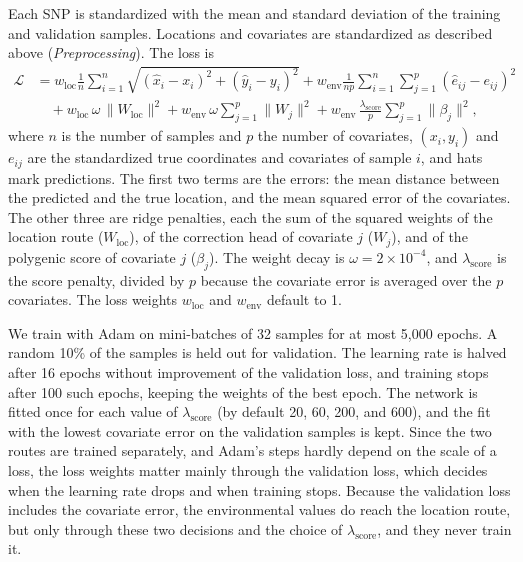 \documentclass[]{article}
\providecommand{\llabel}[1]{}%
\begin{document}
Each SNP is standardized with the mean and standard deviation
of the training and validation samples.
Locations and covariates are standardized as described above
(\textit{Preprocessing}).
The loss is
\begin{equation} \label{eq:1}
\begin{split}
\mathcal{L} &= w_{\text{loc}} \frac{1}{n} \sum_{i=1}^{n}
  \sqrt{(\hat{x}_i - x_i)^2 + (\hat{y}_i - y_i)^2}
  + w_{\text{env}} \frac{1}{np} \sum_{i=1}^{n} \sum_{j=1}^{p}
  (\hat{e}_{ij} - e_{ij})^2 \\
&\quad + w_{\text{loc}}\, \omega\, \|W_{\text{loc}}\|^2
  + w_{\text{env}}\, \omega \sum_{j=1}^{p} \|W_{j}\|^2
  + w_{\text{env}}\, \frac{\lambda_{\text{score}}}{p} \sum_{j=1}^{p} \|\beta_j\|^2,
\end{split}
\end{equation}
where $n$ is the number of samples and $p$ the number of covariates,
$(x_i, y_i)$ and $e_{ij}$ are the standardized true coordinates
and covariates of sample $i$, and hats mark predictions.
The first two terms are the errors:
the mean distance between the predicted and the true location,
and the mean squared error of the covariates.
The other three are ridge penalties,
each the sum of the squared weights
of the location route ($W_{\text{loc}}$),
of the correction head of covariate $j$ ($W_j$),
and of the polygenic score of covariate $j$ ($\beta_j$).
The weight decay is $\omega = 2 \times 10^{-4}$,
and $\lambda_{\text{score}}$ is the score penalty,
divided by $p$ because the covariate error is averaged over the $p$ covariates.
The loss weights $w_{\text{loc}}$ and $w_{\text{env}}$ default to 1.

We train with Adam on mini-batches of 32 samples
for at most 5,000 epochs.
A random 10\% of the samples is held out for validation.
The learning rate is halved after 16 epochs
without improvement of the validation loss,
and training stops after 100 such epochs,
keeping the weights of the best epoch.
The network is fitted once for each value of $\lambda_{\text{score}}$
(by default 20, 60, 200, and 600),
and the fit with the lowest covariate error on the validation samples is kept.
Since the two routes are trained separately,
and Adam's steps hardly depend on the scale of a loss,
the loss weights matter mainly through the validation loss,
which decides when the learning rate drops and when training stops.\llabel{lossweights}
Because the validation loss includes the covariate error,
the environmental values do reach the location route,
but only through these two decisions and the choice of $\lambda_{\text{score}}$,
and they never train it.
\end{document}
